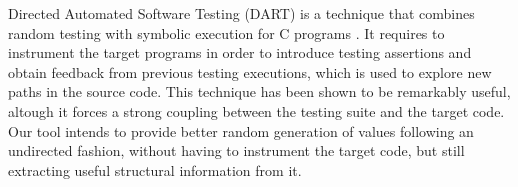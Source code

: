 %
%
Directed Automated Software Testing (DART) is a technique that combines random
testing with symbolic execution for C programs \cite{godefroid2005dart}.
%
It requires to instrument the target programs in order to introduce testing
assertions and obtain feedback from previous testing executions, which is used
to explore new paths in the source code.
%
This technique has been shown to be remarkably useful, altough it forces a
strong coupling between the testing suite and the target code.
%
Our tool intends to provide better random generation of values following an
undirected fashion, without having to instrument the target code, but still
extracting useful structural information from it.
